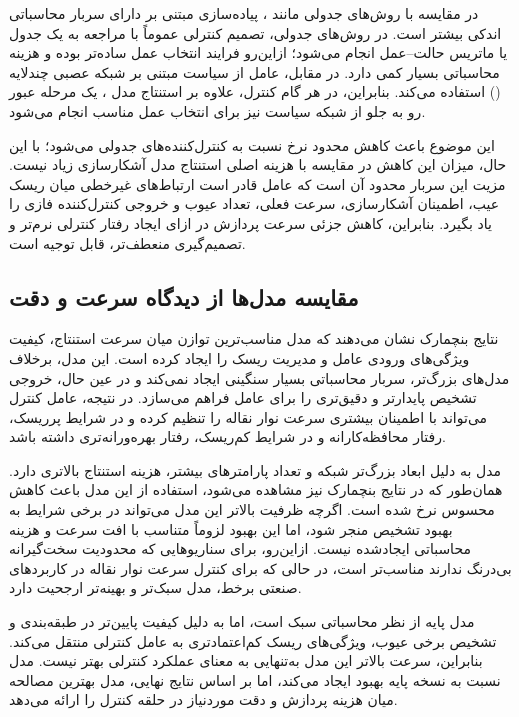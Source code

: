\documentclass[a4paper, 10pt, twocolumn]{article}
\begin{document}
	در مقایسه با روش‌های جدولی مانند ، پیاده‌سازی مبتنی بر
	 دارای سربار محاسباتی اندکی بیشتر است. در روش‌های جدولی، تصمیم
	کنترلی عموماً با مراجعه به یک جدول یا ماتریس حالت--عمل انجام می‌شود؛ ازاین‌رو
	فرایند انتخاب عمل ساده‌تر بوده و هزینه محاسباتی بسیار کمی دارد. در مقابل،
	عامل  از سیاست مبتنی بر شبکه عصبی چندلایه
	() استفاده می‌کند. بنابراین، در هر گام کنترل، علاوه بر
	استنتاج مدل ، یک مرحله عبور رو به جلو از شبکه سیاست نیز برای
	انتخاب عمل مناسب انجام می‌شود.
	
	این موضوع باعث کاهش محدود نرخ  نسبت به کنترل‌کننده‌های جدولی
	می‌شود؛ با این حال، میزان این کاهش در مقایسه با هزینه اصلی استنتاج مدل
	آشکارسازی زیاد نیست. مزیت این سربار محدود آن است که عامل  قادر
	است ارتباط‌های غیرخطی میان ریسک عیب، اطمینان آشکارسازی، سرعت فعلی،
	تعداد عیوب و خروجی کنترل‌کننده فازی را یاد بگیرد. بنابراین، کاهش جزئی
	سرعت پردازش در ازای ایجاد رفتار کنترلی نرم‌تر و تصمیم‌گیری منعطف‌تر،
	قابل توجیه است.
	
	\subsection{مقایسه مدل‌ها از دیدگاه سرعت و دقت}
	
	نتایج بنچمارک نشان می‌دهند که مدل  مناسب‌ترین
	توازن میان سرعت استنتاج، کیفیت ویژگی‌های ورودی عامل و مدیریت ریسک را
	ایجاد کرده است. این مدل، برخلاف مدل‌های بزرگ‌تر، سربار محاسباتی بسیار
	سنگینی ایجاد نمی‌کند و در عین حال، خروجی تشخیص پایدارتر و دقیق‌تری را برای
	عامل  فراهم می‌سازد. در نتیجه، عامل کنترل می‌تواند با اطمینان
	بیشتری سرعت نوار نقاله را تنظیم کرده و در شرایط پرریسک، رفتار محافظه‌کارانه
	و در شرایط کم‌ریسک، رفتار بهره‌ورانه‌تری داشته باشد.
	
	مدل  به دلیل ابعاد بزرگ‌تر شبکه و تعداد پارامترهای بیشتر،
	هزینه استنتاج بالاتری دارد. همان‌طور که در نتایج بنچمارک نیز مشاهده
	می‌شود، استفاده از این مدل باعث کاهش محسوس نرخ  شده است. اگرچه
	ظرفیت بالاتر این مدل می‌تواند در برخی شرایط به بهبود تشخیص منجر شود،
	اما این بهبود لزوماً متناسب با افت سرعت و هزینه محاسباتی ایجادشده نیست.
	ازاین‌رو،  برای سناریوهایی که محدودیت سخت‌گیرانه بی‌درنگ
	ندارند مناسب‌تر است، در حالی که برای کنترل سرعت نوار نقاله در کاربردهای
	صنعتی برخط، مدل سبک‌تر و بهینه‌تر ارجحیت دارد.
	
	مدل پایه  از نظر محاسباتی سبک است، اما به دلیل کیفیت پایین‌تر
	در طبقه‌بندی و تشخیص برخی عیوب، ویژگی‌های ریسک کم‌اعتماد‌تری به عامل
	کنترلی منتقل می‌کند. بنابراین، سرعت بالاتر این مدل به‌تنهایی به معنای
	عملکرد کنترلی بهتر نیست. مدل  نسبت به نسخه پایه بهبود
	ایجاد می‌کند، اما بر اساس نتایج نهایی، مدل  بهترین
	مصالحه میان هزینه پردازش و دقت موردنیاز در حلقه کنترل را ارائه می‌دهد.
	
\end{document}
